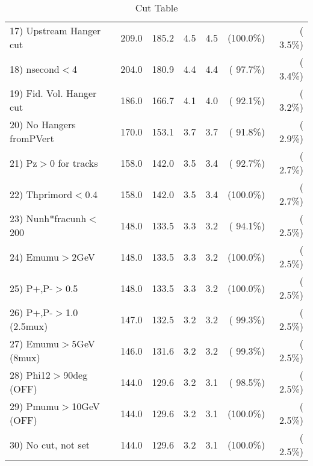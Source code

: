 \begin{table}[h!]
\begin{tabular}{||l||r|r|r|r|r|r||}
 17) Upstream Hanger cut  &        209.0 &        185.2 &          4.5 &          4.5 & (100.0\%) & (  3.5\%) \\
 18) nsecond$<$4          &        204.0 &        180.9 &          4.4 &          4.4 & ( 97.7\%) & (  3.4\%) \\
 19) Fid. Vol. Hanger cut &        186.0 &        166.7 &          4.1 &          4.0 & ( 92.1\%) & (  3.2\%) \\
 20) No Hangers fromPVert &        170.0 &        153.1 &          3.7 &          3.7 & ( 91.8\%) & (  2.9\%) \\
 21) Pz$>$0 for tracks    &        158.0 &        142.0 &          3.5 &          3.4 & ( 92.7\%) & (  2.7\%) \\
 22) Thprimord$<$0.4      &        158.0 &        142.0 &          3.5 &          3.4 & (100.0\%) & (  2.7\%) \\
 23) Nunh*fracunh$<$200   &        148.0 &        133.5 &          3.3 &          3.2 & ( 94.1\%) & (  2.5\%) \\
 24) Emumu$>$2GeV         &        148.0 &        133.5 &          3.3 &          3.2 & (100.0\%) & (  2.5\%) \\
 25) P+,P-$>$0.5          &        148.0 &        133.5 &          3.3 &          3.2 & (100.0\%) & (  2.5\%) \\
 26) P+,P-$>$1.0 (2.5mux) &        147.0 &        132.5 &          3.2 &          3.2 & ( 99.3\%) & (  2.5\%) \\
 27) Emumu$>$5GeV  (8mux) &        146.0 &        131.6 &          3.2 &          3.2 & ( 99.3\%) & (  2.5\%) \\
 28) Phi12$>$90deg  (OFF) &        144.0 &        129.6 &          3.2 &          3.1 & ( 98.5\%) & (  2.5\%) \\
 29) Pmumu$>$10GeV  (OFF) &        144.0 &        129.6 &          3.2 &          3.1 & (100.0\%) & (  2.5\%) \\
 30) No cut, not set      &        144.0 &        129.6 &          3.2 &          3.1 & (100.0\%) & (  2.5\%) \\
 \hline
 \hline
 \end{tabular}
 \caption{Cut Table           }
 \label{tab-cutcohjpsi-mumu_cohpip}
 \end{table}
